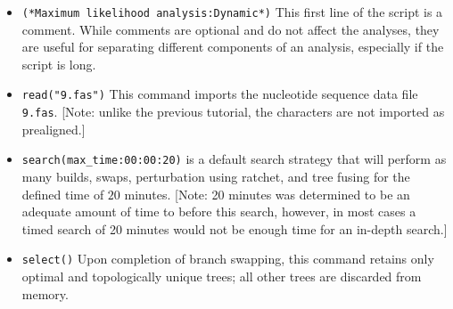 \begin{itemize}
\item \texttt{(*Maximum likelihood analysis:Dynamic*)} This first line of the script is a comment. 
While comments are optional and do not affect the analyses, they are useful for separating different 
components of an analysis, especially if the script is long.  
\item \texttt{read("9.fas")} This command imports the nucleotide sequence data file \texttt{9.fas}.
[Note: unlike the previous tutorial, the characters are not imported as prealigned.]
\item \texttt{search(max\_time:00:00:20)}  is a default search strategy that 
will perform as many builds, swaps, perturbation using ratchet, and tree fusing for the defined time 
of $ 20 $ minutes.  [Note: 20 minutes was determined to be an adequate amount of time to before 
this search, however, in most cases a timed search of 20 minutes would not be enough time for an 
in-depth search.]
\item \texttt{select()} Upon completion of branch swapping, this command retains only optimal and 
topologically unique trees; all other trees are discarded from memory.


\end{itemize}
